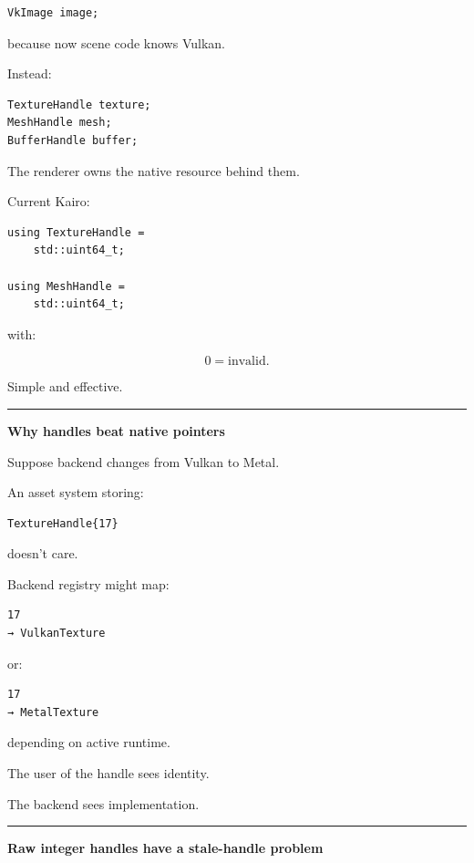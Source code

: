 \begin{verbatim}
VkImage image;
\end{verbatim}

because now scene code knows Vulkan.

Instead:

\begin{verbatim}
TextureHandle texture;
MeshHandle mesh;
BufferHandle buffer;
\end{verbatim}

The renderer owns the native resource behind them.

Current Kairo:

\begin{verbatim}
using TextureHandle =
    std::uint64_t;

using MeshHandle =
    std::uint64_t;
\end{verbatim}

with:

\[
0=\text{invalid}.
\]

Simple and effective.

\begin{center}\rule{0.5\linewidth}{0.5pt}\end{center}

\textbf{Why handles beat native pointers}

Suppose backend changes from Vulkan to Metal.

An asset system storing:

\begin{verbatim}
TextureHandle{17}
\end{verbatim}

doesn't care.

Backend registry might map:

\begin{verbatim}
17
→ VulkanTexture
\end{verbatim}

or:

\begin{verbatim}
17
→ MetalTexture
\end{verbatim}

depending on active runtime.

The user of the handle sees identity.

The backend sees implementation.

\begin{center}\rule{0.5\linewidth}{0.5pt}\end{center}

\textbf{Raw integer handles have a stale-handle problem}


